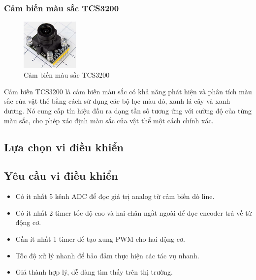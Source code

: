         \subsubsection{Cảm biến màu sắc TCS3200}
            \begin{figure}[H]
                \centering
                \includegraphics[width=0.25\textwidth]{pictures/chapter2/chapter2_pic_10.png}
                \caption{Cảm biến màu sắc TCS3200}
                \label{fig:tcs3200}
            \end{figure}
            \hspace*{0.6cm}Cảm biến TCS3200 là cảm biến màu sắc có khả năng phát hiện và phân tích màu sắc của vật thể bằng cách sử dụng các bộ lọc màu đỏ, xanh lá cây và xanh dương. Nó cung cấp tín hiệu đầu ra dạng tần số tương ứng với cường độ của từng màu sắc, cho phép xác định màu sắc của vật thể một cách chính xác.
        \subsection{Lựa chọn vi điều khiển}
            \subsection{Yêu cầu vi điều khiển}
                \begin{itemize}
                    \item Có ít nhất 5 kênh ADC để đọc giá trị analog từ cảm biến dò line. 
                    \item Có ít nhất 2 timer tốc độ cao và hai chân ngắt ngoài để đọc encoder trả về từ động cơ. 
                    \item Cần ít nhất 1 timer để tạo xung PWM cho hai động cơ. 
                    \item Tốc độ xử lý nhanh để bảo đảm thực hiện các tác vụ nhanh.
                    \item Giá thành hợp lý, dễ dàng tìm thấy trên thị trường. 
                \end{itemize}
